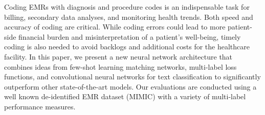 Coding EMRs with diagnosis and procedure codes is an indispensable task for billing, secondary data analyses, and monitoring health trends. Both speed and accuracy of coding are critical. While coding errors could lead to more patient-side financial burden and misinterpretation of a patient's well-being, timely coding is also needed to avoid backlogs and additional costs for the healthcare facility. In this paper, we present a new neural network architecture that combines ideas from few-shot learning matching networks, multi-label loss functions, and convolutional neural networks for text classification to significantly outperform other state-of-the-art models. Our evaluations are conducted using a well known de-identified EMR dataset (MIMIC) with a variety of multi-label performance measures.
